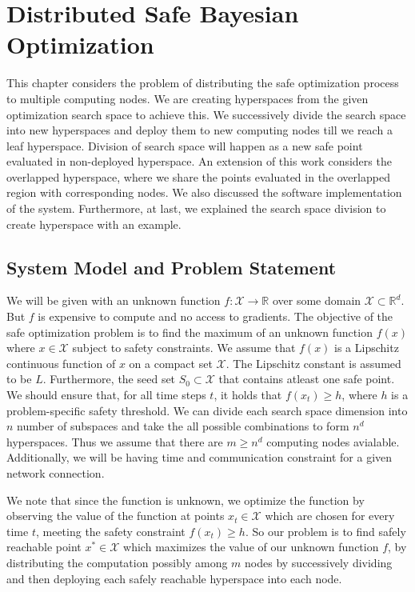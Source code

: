 \chapter{Distributed Safe Bayesian Optimization}
\label{ch:distbo}


This chapter considers the problem of distributing the safe optimization process to multiple computing nodes. We are creating hyperspaces from the given optimization search space to achieve this. We successively divide the search space into new hyperspaces and deploy them to new computing nodes till we reach a leaf hyperspace. Division of search space will happen as a new safe point evaluated in non-deployed hyperspace. An extension of this work considers the overlapped hyperspace, where we share the points evaluated in the overlapped region with corresponding nodes. We also discussed the software implementation of the system. Furthermore, at last, we explained the search space division to create hyperspace with an example.

\section{System Model and Problem Statement}
\par We will be given with an unknown function $f: \mathcal{X} \to \mathbb{R}$ over some domain $\mathcal{X} \subset \mathbb{R}^d$. But $f$ is expensive to compute and no access to gradients.
The objective of the safe optimization problem is to find the maximum of an unknown function $f(x)$ where $x \in \mathcal{X}$ subject to safety constraints. 
We assume that $f(x)$ is a Lipschitz continuous function of $x$ on a compact set $\mathcal{X}$. The Lipschitz constant is assumed to be $L$.
Furthermore, the seed set $S_0 \subset \mathcal{X}$ that contains atleast one safe point. 
We should ensure that, for all time steps $t$, it holds that $f(x_t) \geq h$, where $h$ is a problem-specific safety threshold.
We can divide each search space dimension into $n$ number of subspaces and take the all possible combinations to form $n^d$ hyperspaces. Thus we assume that there are $m \ge n^d$ computing nodes avialable. 
Additionally, we will be having time and communication constraint for a given network connection.
\par We note that since the function is unknown, we optimize the function by observing the value of the function at points $x_t \in \mathcal{X}$ which are chosen for every time $t$, meeting the safety constraint $f(x_t) \geq h$.
So our problem is to find safely reachable point $x^* \in \mathcal{X}$ which maximizes the value of our unknown function $f$, by distributing the computation possibly among $m$ nodes by successively dividing and then deploying each safely reachable hyperspace into each node.

